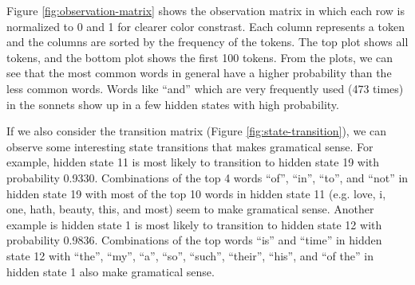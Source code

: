 Figure \ref{fig:observation-matrix} shows the observation matrix in which each row is normalized to 0 and 1 for clearer color constrast. Each column represents a token and the columns are sorted by the frequency of the tokens. The top plot shows all tokens, and the bottom plot shows the first 100 tokens. From the plots, we can see that the most common words in general have a higher probability than the less common words. Words like ``and'' which are very frequently used (473 times) in the sonnets show up in a few hidden states with high probability.

If we also consider the transition matrix (Figure \ref{fig:state-transition}), we can observe some interesting state transitions that makes gramatical sense. For example, hidden state 11 is most likely to transition to hidden state 19 with probability 0.9330. Combinations of the top 4 words ``of'', ``in'', ``to'', and ``not'' in hidden state 19 with most of the top 10 words in hidden state 11 (e.g. love, i, one, hath, beauty, this, and most) seem to make gramatical sense. Another example is hidden state 1 is most likely to transition to hidden state 12 with probability 0.9836. Combinations of the top words ``is'' and ``time'' in hidden state 12 with ``the'', ``my'', ``a'', ``so'', ``such'', ``their'', ``his'', and ``of the'' in hidden state 1 also make gramatical sense.


